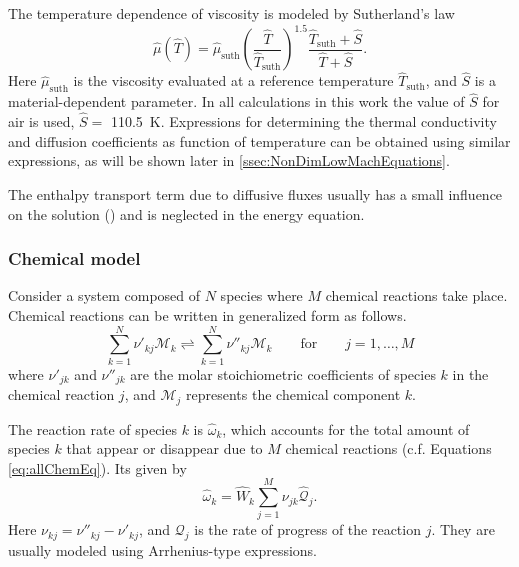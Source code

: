 The temperature dependence of viscosity is modeled by Sutherland's law \parencite{sutherlandLIIViscosityGases1893}
\begin{equation}\label{eq:DimSutherland}
	\hat{\mu}(\hat{T}) = \hat{\mu}_{\text{suth}}\left(\frac{\hat{T}}{\hat{T}_{\text{suth}}}\right)^{1.5}\frac{\hat{T}_{\text{suth}} + \hat{S}}{\hat{T}+\hat{S}}.
\end{equation}
Here $\hat{\mu}_{\text{suth}}$ is the viscosity evaluated at a reference temperature $\hat{T}_{\text{suth}}$, and $\hat S$ is a material-dependent parameter. In all calculations in this work the value of $\hat{S}$ for air is used, $\hat{S} = $ \SI{110.5}{\kelvin}. Expressions for determining the thermal conductivity and diffusion coefficients as function of temperature can be obtained using similar expressions, as will be shown later in \cref{ssec:NonDimLowMachEquations}.

The enthalpy transport term due to diffusive fluxes usually has a small influence on the solution (\textcite{smokeFormulationPremixedNonpremixed1991, goeyModelingSmallScale1995,paxionDevelopmentParallelUnstructured2001}) and is neglected in the energy equation. 

\subsubsection{Chemical model}
Consider a system composed of $N$ species where $M$ chemical reactions take place. Chemical reactions can be written in generalized form as follows.
\begin{equation}\label{eq:allChemEq}
	\sum_{k=1}^{N} \nu'_{kj}\mathcal{M}_k  \rightleftharpoons \sum_{k=1}^{N} \nu''_{kj}\mathcal{M}_k  \qquad \text{for}\qquad j=1,\dots,M
\end{equation}
where $\nu'_{jk}$ and $\nu''_{jk}$ are the molar stoichiometric coefficients of species $k$ in the chemical reaction $j$, and $\mathcal{M}_j$ represents the chemical component $k$. \newline

The reaction rate of species $k$ is $\hat \omega_k$, which accounts for the total amount of species $k$ that appear or disappear due to $M$ chemical reactions (c.f. Equations \eqref{eq:allChemEq}). Its given by
\begin{equation} \label{eq:reacRateDef}
	\hat \omega_k  = \hat W_k \sum_{j=1}^{M}\nu_{jk}\hat{\mathcal{Q}}_j.
\end{equation}
Here $\nu_{kj} = \nu''_{kj} -\nu'_{kj}$, and $\mathcal{Q}_j$ is the rate of progress of the reaction $j$. They are usually modeled using Arrhenius-type expressions.\newline

